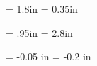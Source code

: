 

%
%
%
%
%
%




\pagestyle{empty}


\newcount\nrows\newcount\ncols
{}		%

\newdimen\vcorner \newdimen\hcorner 
\newdimen\vlabel \newdimen\hlabel

\vcorner = 1.8in	%
\hcorner = 0.35in	%

\vlabel  = .95in	%
\hlabel  = 2.8in	%

\newdimen \vfudge \newdimen \hfudge
\vfudge = -0.05 in 	%
\hfudge = -0.2 in


